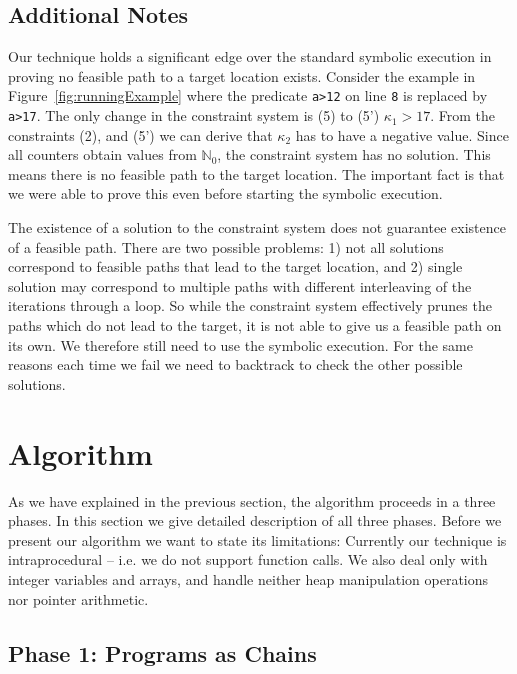 \documentclass{llncs}
\newcommand{\N}{\mathbb{N}}
\begin{document}
\subsection{Additional Notes}
\label{sec:OverviewNotes}

Our technique holds a significant edge over the standard symbolic execution
in proving no feasible path to a target location exists. Consider the
example in Figure~\ref{fig:runningExample} where the predicate \texttt{a>12}
on line \texttt{8} is replaced by \texttt{a>17}. 
The only change in the constraint system is (5) to (5') $\kappa_1 > 17$. 
From the constraints (2), and (5') we can derive that $\kappa_2$
has to have a negative value. Since all counters obtain values from $\N_0$, the constraint system has no solution. This means
there is no feasible path to the target location. The important fact is that
we were able to prove this even before starting the symbolic execution. 

The existence of a solution to the constraint system does not guarantee
existence of a feasible path. There are two possible problems: 1) not all
solutions correspond to feasible paths that lead to the target location, and
2) single solution may correspond to multiple paths with different
interleaving of the iterations through a loop.  So while the constraint
system effectively prunes the paths which do not lead to the target, it is
not able to give us a feasible path on its own. We therefore still need to
use the symbolic execution. For the same reasons each time we fail we need
to backtrack to check the other possible solutions.


\section{Algorithm}
\label{sec:Algorithm}

As we have explained in the previous section, the algorithm proceeds in a
three phases. 
In this section we give detailed description
of all three phases. 
Before we present our algorithm we want to state its limitations:
Currently our technique is intraprocedural -- i.e. we do not
support function calls.  We also deal only with integer variables and
arrays, and handle neither heap manipulation operations nor pointer
arithmetic.

\subsection{Phase 1: Programs as Chains}
\label{sec:AlgChains}
\end{document}
